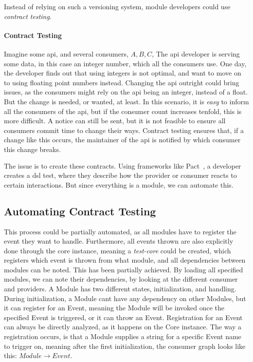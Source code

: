 Instead of relying on such a versioning system, module developers could use
\textit{contract testing}.

\paragraph{Contract Testing} Imagine some \gls*{api}, and several consumers,
$A, B, C$, The \gls*{api} developer is serving some data, in this case an
integer number, which all the consumers use. One day, the developer finds out
that using integers is not optimal, and want to move on to using floating point
numbers instead. Changing the \gls*{api} outright could bring issues, as the
consumers might rely on the \gls*{api} being an integer, instead of a float. But
the change is needed, or wanted, at least. In this scenario, it is \textit{easy}
to inform all the consumers of the \gls*{api}, but if the consumer count
increases tenfold, this is more difficult. A notice can still be sent, but it is
not feasible to ensure all consumers commit time to change their ways. Contract
testing ensures that, if a change like this occurs, the maintainer of the
\gls*{api} is notified by which consumer this change breaks.

The issue is to create these contracts. Using frameworks like Pact~\cite{pact},
a developer creates a \gls*{dsl} test, where they describe how the provider or
consumer reacts to certain interactions. But since everything is a module, we
can automate this.

\subsection{Automating Contract Testing}

This process could be partially automated, as all modules have to register the
event they want to handle. Furthermore, all events thrown are also explicitly
done through the core instance, meaning a \textit{test-core} could be created,
which registers which event is thrown from what module, and all dependencies
between modules can be noted. This has been partially achieved. By loading all
specified modules, we can note their dependencies, by looking at the different
consumer and providers. A Module has two different states, initialization, and
handling. During initialization, a Module cant have any dependency on other
Modules, but it can register for an Event, meaning the Module will be invoked
once the specified Event is triggered, or it can throw an Event. Registration
for an Event can always be directly analyzed, as it happens on the Core
instance. The way a registration occurs, is that a Module supplies a string for
a specific Event name to trigger on, meaning after the first initialization, the
consumer graph looks like this: $Module \to Event$.

